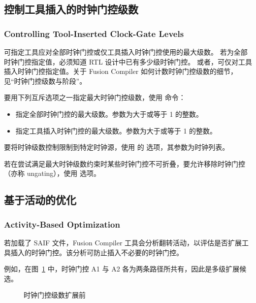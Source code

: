 \subsection{控制工具插入的时钟门控级数}
\subsubsection*{Controlling Tool-Inserted Clock-Gate Levels}

可指定工具应对全部时钟门控或仅工具插入时钟门控使用的最大级数。
若为全部时钟门控指定值，必须知道 RTL 设计中已有多少级时钟门控。
或者，可仅对工具插入时钟门控指定值。关于 Fusion Compiler 如何计数时钟门控级数的细节，见“时钟门控级数与阶段”。

要用下列互斥选项之一指定最大时钟门控级数，使用  命令：
\begin{itemize}
  \item {} 指定全部时钟门控的最大级数。参数为大于或等于 1 的整数。
  \item {} 指定工具插入时钟门控的最大级数。参数为大于或等于 1 的整数。
\end{itemize}

要将时钟级数控制限制到特定时钟源，使用  的  选项，其参数为时钟列表。

若在尝试满足最大时钟级数约束时某些时钟门控不可折叠，要允许移除时钟门控（亦称 ungating），使用  选项。

\subsection{基于活动的优化}
\subsubsection*{Activity-Based Optimization}

若加载了 SAIF 文件，Fusion Compiler 工具会分析翻转活动，以评估是否扩展工具插入的时钟门控。该分析可防止插入不必要的时钟门控。

例如，在图~\ref{fig:cg-before-expand} 中，时钟门控 A1 与 A2 各为两条路径所共有，因此是多级扩展候选。

\begin{figure}[htbp]
\centering
{}
\caption{时钟门控级数扩展前}
\label{fig:cg-before-expand}
\end{figure}

